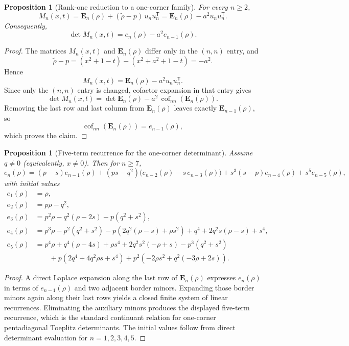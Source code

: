 \documentclass[11pt]{article}
\numberwithin{equation}{section}
\newtheorem{proposition}[theorem]{Proposition}
\begin{document}
\begin{proposition}[Rank-one reduction to a one-corner family]
\label{prop:rank-one-reduction}
For every \(n\ge2\),
\[
M_n(x,t)=\mathbf E_n(\rho)+(\widetilde\rho-p)\,u_nu_n^{\mathsf T}
       =\mathbf E_n(\rho)-a^2u_nu_n^{\mathsf T}.
\]
Consequently,
\[
\det M_n(x,t)=e_n(\rho)-a^2 e_{n-1}(\rho).
\]
\end{proposition}

\begin{proof}
The matrices \(M_n(x,t)\) and \(\mathbf E_n(\rho)\) differ only in the \((n,n)\) entry,
and
\[
\widetilde\rho-p=(x^2+1-t)-(x^2+a^2+1-t)=-a^2.
\]
Hence
\[
M_n(x,t)=\mathbf E_n(\rho)-a^2u_nu_n^{\mathsf T}.
\]
Since only the \((n,n)\) entry is changed, cofactor expansion in that entry gives
\[
\det M_n(x,t)=\det \mathbf E_n(\rho)-a^2\,\operatorname{cof}_{nn}(\mathbf E_n(\rho)).
\]
Removing the last row and last column from \(\mathbf E_n(\rho)\) leaves exactly
\(\mathbf E_{n-1}(\rho)\), so
\[
\operatorname{cof}_{nn}(\mathbf E_n(\rho))=e_{n-1}(\rho),
\]
which proves the claim.
\end{proof}

\begin{proposition}[Five-term recurrence for the one-corner determinant]
\label{prop:e-recurrence}
Assume \(q\neq0\) (equivalently, \(x\neq0\)). Then for \(n\ge7\),
\[
e_n(\rho)
=
(p-s)e_{n-1}(\rho)
+(ps-q^2)\bigl(e_{n-2}(\rho)-s\,e_{n-3}(\rho)\bigr)
+s^3(s-p)e_{n-4}(\rho)
+s^5e_{n-5}(\rho),
\]
with initial values
\begin{align*}
e_1(\rho)&=\rho,\\
e_2(\rho)&=p\rho-q^2,\\
e_3(\rho)&=p^2\rho-q^2(\rho-2s)-p(q^2+s^2),\\
e_4(\rho)&=p^3\rho-p^2(q^2+s^2)-p\!\left(2q^2(\rho-s)+\rho s^2\right)
          +q^4+2q^2s(\rho-s)+s^4,\\
e_5(\rho)&=p^4\rho+q^4(\rho-4s)+\rho s^4+2q^2s^2(-\rho+s)-p^3(q^2+s^2)\\
&\qquad
          +p\!\left(2q^4+4q^2\rho s+s^4\right)
          +p^2\!\left(-2\rho s^2+q^2(-3\rho+2s)\right).
\end{align*}
\end{proposition}

\begin{proof}
A direct Laplace expansion along the last row of \(\mathbf E_n(\rho)\) expresses
\(e_n(\rho)\) in terms of \(e_{n-1}(\rho)\) and two adjacent border minors.  Expanding
those border minors again along their last rows yields a closed finite system of linear
recurrences.  Eliminating the auxiliary minors produces the displayed five-term
recurrence, which is the standard continuant relation for one-corner pentadiagonal
Toeplitz determinants.  The initial values follow from direct determinant evaluation
for \(n=1,2,3,4,5\).
\end{proof}
\end{document}
